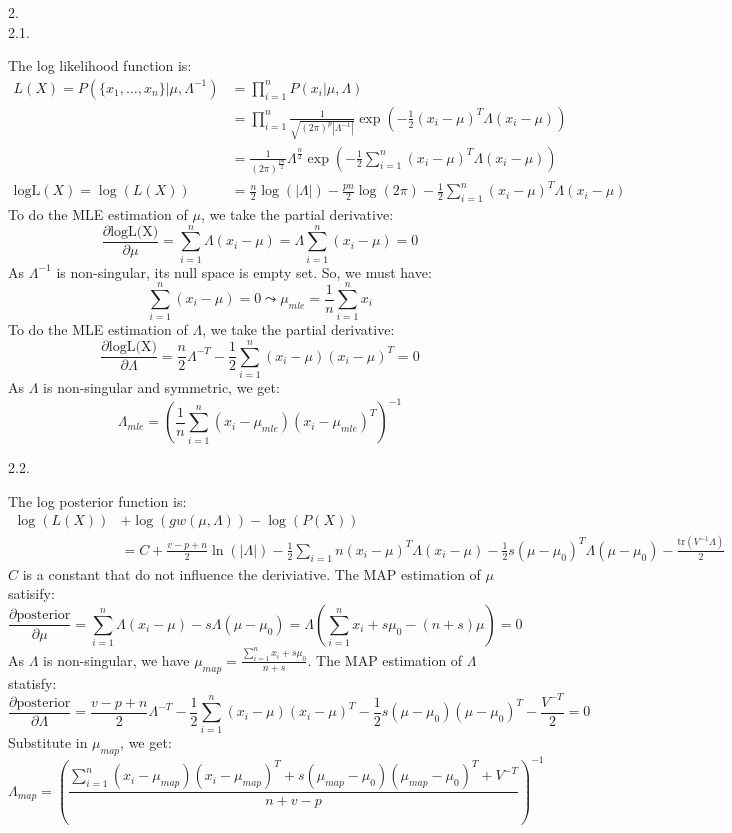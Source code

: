 \documentclass{article}
\theoremstyle{definition}
\theoremstyle{definition}
\theoremstyle{remark}
\begin{document}
2.\\
2.1.

\begin{addmargin}[3em]{2em}
  The log likelihood function is:
    \[
  \begin{split}
    L(X) = P(\{x_1, \dots, x_n\} | \mu, \Lambda^{-1}) & = \prod_{i=1}^{n} P(x_i | \mu, \Lambda) \\
    & = \prod_{i=1}^{n} \frac{1}{\sqrt{{(2\pi)}^p|\Lambda^{-1}|}} \exp(-\frac{1}{2} {(x_i - \mu)}^T \Lambda (x_i - \mu))\\
    & = \frac{1}{{(2\pi)}^{\frac{pn}{2}}} {\Lambda}^{\frac{n}{2}} \exp(-\frac{1}{2} \sum_{i=1}^n {(x_i - \mu)}^T \Lambda (x_i - \mu)) \\
    \mbox{logL}(X) = \log(L(X)) & = \frac{n}{2} \log(|\Lambda|) - \frac{pn}{2} \log(2\pi) - \frac{1}{2} \sum_{i=1}^n {(x_i - \mu)}^T \Lambda (x_i - \mu)
  \end{split}
  \]
  To do the MLE estimation of $\mu$, we take the partial derivative:
  \[
  \frac{\partial \mbox{logL(X)}}{\partial \mu} = \sum_{i=1}^n \Lambda (x_i - \mu) = \Lambda \sum_{i=1}^n (x_i - \mu) = 0  \]
  As $\Lambda^{-1}$ is non-singular, its null space is empty set. So, we must have:
  \[
  \sum_{i=1}^n (x_i - \mu) = 0 \leadsto \mu_{mle} = \frac{1}{n} \sum_{i=1}^n x_i
  \]
  To do the MLE estimation of $\Lambda$, we take the partial derivative:
  \[
  \frac{\partial \mbox{logL(X)}}{\partial \Lambda} = \frac{n}{2} \Lambda^{-T} - \frac{1}{2} \sum_{i=1}^n (x_i - \mu)(x_i - \mu)^T = 0
  \]
  As $\Lambda$ is non-singular and symmetric, we get:
  \[
  \Lambda_{mle} = {(\frac{1}{n} \sum_{i=1}^n (x_i - \mu_{mle}){(x_i - \mu_{mle})}^T)}^{-1}
  \]
\end{addmargin}

2.2.

\begin{addmargin}[3em]{2em}
  The log posterior function is:
  \[
  \begin{split}
    \log(L(X)) & + \log(gw(\mu, \Lambda)) - \log(P(X))\\
    & = C + \frac{v-p+n}{2}\ln(|\Lambda|) - \frac{1}{2} \sum_{i=1}{n} (x_i - \mu)^T \Lambda (x_i - \mu) - \frac{1}{2}s(\mu - \mu_0)^T \Lambda (\mu - \mu_0) - \frac{\mbox{tr}(V^{-1}\Lambda)}{2}
  \end{split}
  \]
  $C$ is a constant that do not influence the deriviative. The MAP estimation of $\mu$ satisify:
  \[
  \frac{\partial \mbox{posterior}}{\partial \mu} = \sum_{i=1}^n \Lambda (x_i - \mu) - s \Lambda (\mu - \mu_0) = \Lambda (\sum_{i=1}^n x_i + s\mu_0 - (n+s)\mu) = 0
  \]
  As $\Lambda$ is non-singular, we have $\mu_{map} = \frac{\sum_{i=1}^n x_i + s\mu_0}{n + s}$.
  The MAP estimation of $\Lambda$ statisfy:
  \[
  \frac{\partial \mbox{posterior}}{\partial \Lambda} = \frac{v - p + n}{2}\Lambda^{-T} - \frac{1}{2} \sum_{i=1}^n (x_i - \mu)(x_i - \mu)^T - \frac{1}{2} s (\mu - \mu_0)(\mu - \mu_0)^T - \frac{V^{-T}}{2} = 0
  \]
  Substitute in $\mu_{map}$, we get:
  \[
  \Lambda_{map} = {(\frac{\sum_{i=1}^n (x_i - \mu_{map}){(x_i - \mu_{map})}^T + s(\mu_{map} - \mu_0) (\mu_{map} - \mu_0)^T + V^{-T}}{n + v - p})}^{-1}
  \]

\end{addmargin}
\end{document}
